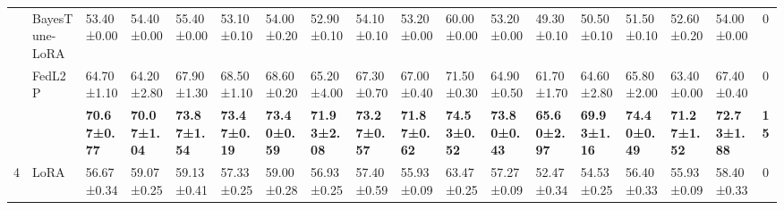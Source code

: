 \begin{table*}[]
\begin{scriptsize}
{\begin{tabular}{c|l|l|l|l|l|l|l|l|l|l|l|l|l|l|l|l|c}
                    & BayesTune-LoRA                            & 53.40±0.00                        & 54.40±0.00                        & 55.40±0.00                        & 53.10±0.10                        & 54.00±0.20                       & 52.90±0.10                        & 54.10±0.10                        & 53.20±0.00                        & 60.00±0.00                        & 53.20±0.00                        & 49.30±0.10                        & 50.50±0.10                        & 51.50±0.10                        & 52.60±0.20                       & 54.00±0.00                        & 0             \\ %
                    & FedL2P                               & 64.70±1.10                        & 64.20±2.80                        & 67.90±1.30                        & 68.50±1.10                        & 68.60±0.20                       & 65.20±4.00                        & 67.30±0.70                        & 67.00±0.40                        & 71.50±0.30                        & 64.90±0.50                        & 61.70±1.70                        & 64.60±2.80                        & 65.80±2.00                        & 63.40±0.00                        & 67.40±0.40                        & 0             \\ %
                    & \method{}                                 & \textbf{70.67±0.77}              & \textbf{70.07±1.04}              & \textbf{73.87±1.54}              & \textbf{73.47±0.19}              & \textbf{73.40±0.59}               & \textbf{71.93±2.08}              & \textbf{73.27±0.57}              & \textbf{71.87±0.62}              & \textbf{74.53±0.52}              & \textbf{73.80±0.43}               & \textbf{65.60±2.97}               & \textbf{69.93±1.16}              & \textbf{74.40±0.49}               & \textbf{71.27±1.52}              & \textbf{72.73±1.88}              & \textbf{15}   \\ \hline
\multirow{5}{*}{4}  & LoRA                                   & 56.67±0.34                       & 59.07±0.25                       & 59.13±0.41                       & 57.33±0.25                       & 59.00±0.28                        & 56.93±0.25                       & 57.40±0.59                        & 55.93±0.09                       & 63.47±0.25                       & 57.27±0.09                       & 52.47±0.34                       & 54.53±0.25                       & 56.40±0.33                        & 55.93±0.09                       & 58.40±0.33                        & 0             \\ %

\end{tabular}}
\end{scriptsize}
\end{table*}
